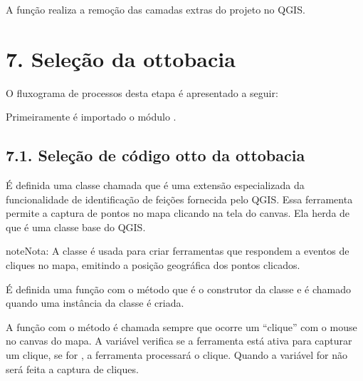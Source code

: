 \documentclass[a4paper,10pt,brazil]{sphinxmanual}
\begin{document}
\sphinxAtStartPar
A função  realiza a remoção das camadas extras do projeto no QGIS.

\sphinxstepscope


\section{7. Seleção da ottobacia}
\label{\detokenize{7definirOttobacia:selecao-da-ottobacia}}\label{\detokenize{7definirOttobacia::doc}}
\sphinxAtStartPar
O fluxograma de processos desta etapa é apresentado a seguir:


\sphinxAtStartPar
Primeiramente é importado o módulo .


\subsection{7.1. Seleção de código otto da ottobacia}
\label{\detokenize{7definirOttobacia:selecao-de-codigo-otto-da-ottobacia}}
\sphinxAtStartPar
É definida uma classe chamada  que é uma extensão especializada da funcionalidade de identificação de feições fornecida pelo QGIS. Essa ferramenta permite a captura de pontos no mapa clicando na tela do canvas. Ela herda de  que é uma classe base do QGIS.

\begin{sphinxadmonition}{note}{Nota:}
\sphinxAtStartPar
A classe  é usada para criar ferramentas que respondem a eventos de cliques no mapa, emitindo a posição geográfica dos pontos clicados.
\end{sphinxadmonition}

\sphinxAtStartPar
É definida uma função com o método  que é o construtor da classe  e é chamado quando uma instância da classe é criada.

\sphinxAtStartPar
A função com o método  é chamada sempre que ocorre um “clique” com o mouse no canvas do mapa. A variável  verifica se a ferramenta está ativa para capturar um clique, se for , a ferramenta processará o clique. Quando a variável  for  não será feita a captura de cliques.
\end{document}
